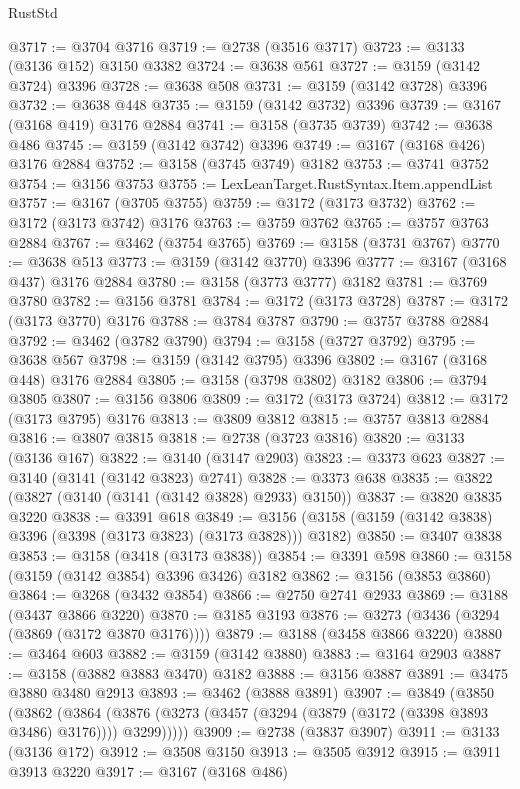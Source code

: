\begin{lexlean}{RustStd}
\begin{coremodule}
@3717 := @3704 @3716
@3719 := @2738 (@3516 @3717)
@3723 := @3133 (@3136 @152) @3150 @3382
@3724 := @3638 @561
@3727 := @3159 (@3142 @3724) @3396
@3728 := @3638 @508
@3731 := @3159 (@3142 @3728) @3396
@3732 := @3638 @448
@3735 := @3159 (@3142 @3732) @3396
@3739 := @3167 (@3168 @419) @3176 @2884
@3741 := @3158 (@3735 @3739)
@3742 := @3638 @486
@3745 := @3159 (@3142 @3742) @3396
@3749 := @3167 (@3168 @426) @3176 @2884
@3752 := @3158 (@3745 @3749) @3182
@3753 := @3741 @3752
@3754 := @3156 @3753
@3755 := LexLeanTarget.RustSyntax.Item.appendList
@3757 := @3167 (@3705 @3755)
@3759 := @3172 (@3173 @3732)
@3762 := @3172 (@3173 @3742) @3176
@3763 := @3759 @3762
@3765 := @3757 @3763 @2884
@3767 := @3462 (@3754 @3765)
@3769 := @3158 (@3731 @3767)
@3770 := @3638 @513
@3773 := @3159 (@3142 @3770) @3396
@3777 := @3167 (@3168 @437) @3176 @2884
@3780 := @3158 (@3773 @3777) @3182
@3781 := @3769 @3780
@3782 := @3156 @3781
@3784 := @3172 (@3173 @3728)
@3787 := @3172 (@3173 @3770) @3176
@3788 := @3784 @3787
@3790 := @3757 @3788 @2884
@3792 := @3462 (@3782 @3790)
@3794 := @3158 (@3727 @3792)
@3795 := @3638 @567
@3798 := @3159 (@3142 @3795) @3396
@3802 := @3167 (@3168 @448) @3176 @2884
@3805 := @3158 (@3798 @3802) @3182
@3806 := @3794 @3805
@3807 := @3156 @3806
@3809 := @3172 (@3173 @3724)
@3812 := @3172 (@3173 @3795) @3176
@3813 := @3809 @3812
@3815 := @3757 @3813 @2884
@3816 := @3807 @3815
@3818 := @2738 (@3723 @3816)
@3820 := @3133 (@3136 @167)
@3822 := @3140 (@3147 @2903)
@3823 := @3373 @623
@3827 := @3140 (@3141 (@3142 @3823) @2741)
@3828 := @3373 @638
@3835 := @3822 (@3827 (@3140 (@3141 (@3142 @3828) @2933) @3150))
@3837 := @3820 @3835 @3220
@3838 := @3391 @618
@3849 := @3156 (@3158 (@3159 (@3142 @3838) @3396 (@3398 (@3173 @3823) (@3173 @3828))) @3182)
@3850 := @3407 @3838
@3853 := @3158 (@3418 (@3173 @3838))
@3854 := @3391 @598
@3860 := @3158 (@3159 (@3142 @3854) @3396 @3426) @3182
@3862 := @3156 (@3853 @3860)
@3864 := @3268 (@3432 @3854)
@3866 := @2750 @2741 @2933
@3869 := @3188 (@3437 @3866 @3220)
@3870 := @3185 @3193
@3876 := @3273 (@3436 (@3294 (@3869 (@3172 @3870 @3176))))
@3879 := @3188 (@3458 @3866 @3220)
@3880 := @3464 @603
@3882 := @3159 (@3142 @3880)
@3883 := @3164 @2903
@3887 := @3158 (@3882 @3883 @3470) @3182
@3888 := @3156 @3887
@3891 := @3475 @3880 @3480 @2913
@3893 := @3462 (@3888 @3891)
@3907 := @3849
    (@3850
      (@3862
        (@3864 (@3876 (@3273 (@3457 (@3294 (@3879 (@3172 (@3398 @3893 @3486) @3176)))) @3299)))))
@3909 := @2738 (@3837 @3907)
@3911 := @3133 (@3136 @172)
@3912 := @3508 @3150
@3913 := @3505 @3912
@3915 := @3911 @3913 @3220
@3917 := @3167 (@3168 @486)

\end{coremodule}
\end{lexlean}
